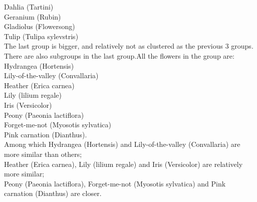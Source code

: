 \documentclass[12pt]{article}
\begin{document}
Dahlia (Tartini)\\               
Geranium (Rubin)\\                
Gladiolus (Flowersong)\\
Tulip (Tulipa sylevstris)\\
The last group is bigger, and relatively not as clustered as the previous 3 groups. There are also subgroups in the last group.All the flowers in the group are:\\
Hydrangea (Hortensis)\\   
Lily-of-the-valley (Convallaria)\\
Heather (Erica carnea)\\
Lily (lilium regale)\\
Iris (Versicolor)\\
Peony (Paeonia lactiflora)\\
Forget-me-not (Myosotis sylvatica)\\
Pink carnation (Dianthus).\\
Among which Hydrangea (Hortensis) and Lily-of-the-valley (Convallaria) are more similar than others;\\
Heather (Erica carnea), Lily (lilium regale) and Iris (Versicolor) are relatively more similar;\\
Peony (Paeonia lactiflora), Forget-me-not (Myosotis sylvatica) and Pink carnation (Dianthus) are closer.\\


\nocite{*}

\end{document}
